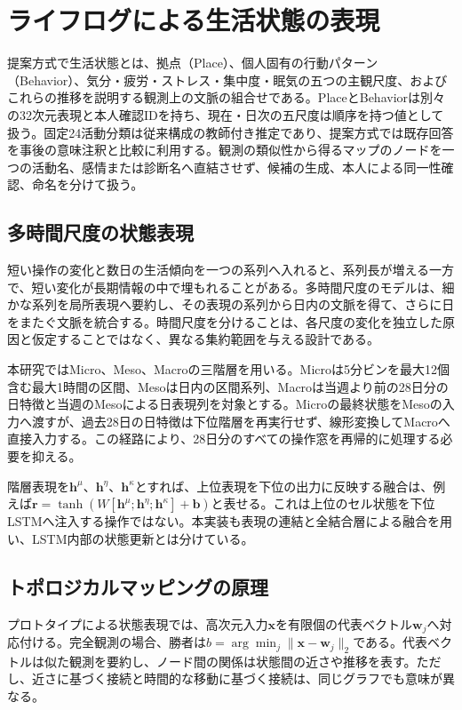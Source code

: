 \section{ライフログによる生活状態の表現}

提案方式で生活状態とは、拠点（Place）、個人固有の行動パターン（Behavior）、気分・疲労・ストレス・集中度・眠気の五つの主観尺度、およびこれらの推移を説明する観測上の文脈の組合せである。PlaceとBehaviorは別々の32次元表現と本人確認IDを持ち、現在・日次の五尺度は順序を持つ値として扱う。固定24活動分類は従来構成の教師付き推定であり、提案方式では既存回答を事後の意味注釈と比較に利用する。観測の類似性から得るマップのノードを一つの活動名、感情または診断名へ直結させず、候補の生成、本人による同一性確認、命名を分けて扱う。

\subsection{多時間尺度の状態表現}

短い操作の変化と数日の生活傾向を一つの系列へ入れると、系列長が増える一方で、短い変化が長期情報の中で埋もれることがある。多時間尺度のモデルは、細かな系列を局所表現へ要約し、その表現の系列から日内の文脈を得て、さらに日をまたぐ文脈を統合する。時間尺度を分けることは、各尺度の変化を独立した原因と仮定することではなく、異なる集約範囲を与える設計である。

本研究ではMicro、Meso、Macroの三階層を用いる。Microは5分ビンを最大12個含む最大1時間の区間、Mesoは日内の区間系列、Macroは当週より前の28日分の日特徴と当週のMesoによる日表現列を対象とする。Microの最終状態をMesoの入力へ渡すが、過去28日の日特徴は下位階層を再実行せず、線形変換してMacroへ直接入力する。この経路により、28日分のすべての操作窓を再帰的に処理する必要を抑える。

階層表現を\(\boldsymbol{h}^{\mu}\)、\(\boldsymbol{h}^{\eta}\)、\(\boldsymbol{h}^{\kappa}\)とすれば、上位表現を下位の出力に反映する融合は、例えば\(\boldsymbol{r}=\tanh(W[\boldsymbol{h}^{\mu};\boldsymbol{h}^{\eta};\boldsymbol{h}^{\kappa}]+\boldsymbol{b})\)と表せる。これは上位のセル状態を下位LSTMへ注入する操作ではない。本実装も表現の連結と全結合層による融合を用い、LSTM内部の状態更新とは分けている。

\subsection{トポロジカルマッピングの原理}

プロトタイプによる状態表現では、高次元入力\(\boldsymbol{x}\)を有限個の代表ベクトル\(\boldsymbol{w}_j\)へ対応付ける。完全観測の場合、勝者は\(b=\arg\min_j\|\boldsymbol{x}-\boldsymbol{w}_j\|_2\)である。代表ベクトルは似た観測を要約し、ノード間の関係は状態間の近さや推移を表す。ただし、近さに基づく接続と時間的な移動に基づく接続は、同じグラフでも意味が異なる。

